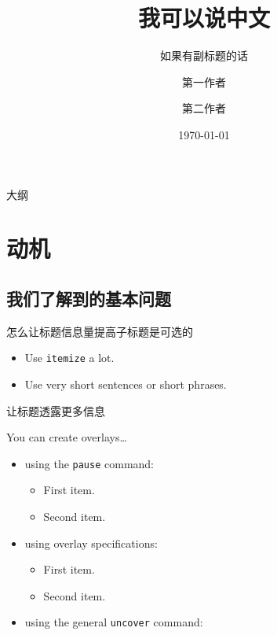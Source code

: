 \documentclass{beamer}
\title[我可以说中文我可以说中文我可以说中文我可以] %
{我可以说中文}
\subtitle
{如果有副标题的话}
\author[宣读作者] %
{第一作者 \and 第二作者}
\institute[商学院] %
{宁波大学商学院}
\date[2013年学术大会] %
{\today}
\begin{document}
\beamertemplatenavigationsymbolsempty 

\begin{frame}[plain]
  \titlepage
\end{frame}

\begin{frame}{大纲}
  \tableofcontents
\end{frame}

\section{动机}

\subsection{我们了解到的基本问题}

\begin{frame}{怎么让标题信息量提高}{子标题是可选的}
  \begin{itemize}
  \item
    Use \texttt{itemize} a lot.
  \item
    Use very short sentences or short phrases.
  \end{itemize}
\end{frame}

\begin{frame}{让标题透露更多信息}

  You can create overlays\dots
  \begin{itemize}
  \item using the \texttt{pause} command:
    \begin{itemize}
    \item
      First item.
      \pause
    \item
      Second item.
    \end{itemize}
  \item
    using overlay specifications:
    \begin{itemize}
    \item<3->
      First item.
    \item<4->
      Second item.
    \end{itemize}
  \item
    using the general \texttt{uncover} command:
    \begin{itemize}
    \end{itemize}
  \end{itemize}
\end{frame}
\end{document}
